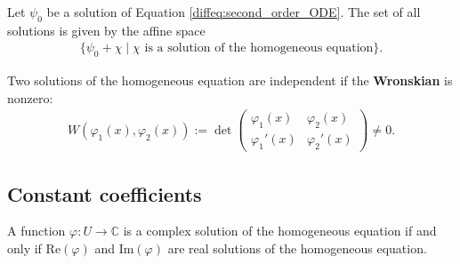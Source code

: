     \begin{property}
        Let $\psi_0$ be a solution of Equation \eqref{diffeq:second_order_ODE}. The set of all solutions is given by the affine space
        \begin{gather}
            \big\{\psi_0 + \chi\mid\chi\text{ is a solution of the homogeneous equation}\big\}.
        \end{gather}
    \end{property}
    \begin{property}
        Two solutions of the homogeneous equation are independent if the \textbf{Wronskian} is nonzero:
        \begin{gather}
            \label{diffeq:wronskian}
            W\left(\varphi_1(x),\varphi_2(x)\right) := \det
            \begin{pmatrix}
                \varphi_1(x)&\varphi_2(x)\\
                \varphi_1'(x)&\varphi_2'(x)
            \end{pmatrix}
            \neq 0.
        \end{gather}
    \end{property}


\subsection{Constant coefficients}

    \begin{property}
        A function $\varphi:U\rightarrow\mathbb{C}$ is a complex solution of the homogeneous equation if and only if $\mathrm{Re}(\varphi)$ and $\mathrm{Im}(\varphi)$ are real solutions of the homogeneous equation.
    \end{property}

